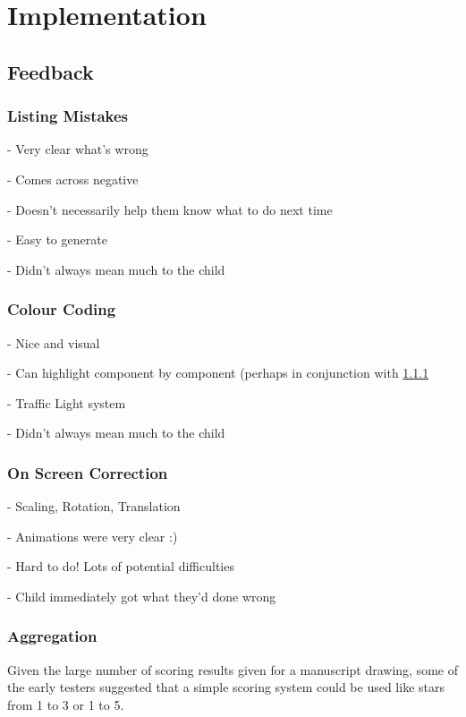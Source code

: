 \chapter{Implementation}




\section{Feedback}

\subsection{Listing Mistakes}
\label{sec:feedback-listing}

- Very clear what's wrong

- Comes across negative

- Doesn't necessarily help them know what to do next time

- Easy to generate

- Didn't always mean much to the child

\subsection{Colour Coding}

- Nice and visual

- Can highlight component by component (perhaps in conjunction with \cref{sec:feedback-listing}

- Traffic Light system

- Didn't always mean much to the child

\subsection{On Screen Correction}

- Scaling, Rotation, Translation

- Animations were very clear :)

- Hard to do! Lots of potential difficulties

- Child immediately got what they'd done wrong

\subsection{Aggregation}
Given the large number of scoring results given for a manuscript drawing, some of the early testers suggested that a simple scoring system could be used like stars from 1 to 3 or 1 to 5.

